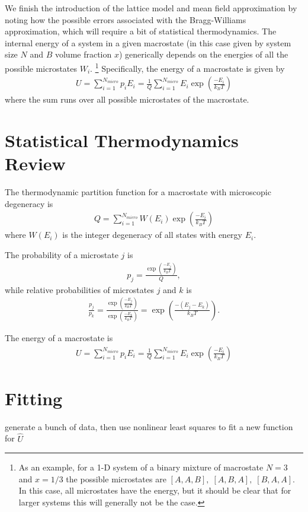 \documentclass[10pt]{article}
\begin{document}
We finish the introduction of the lattice model and mean field approximation by noting how the possible errors associated with the Bragg-Williams approximation, which will require a bit of statistical thermodynamics.
The internal energy of a system in a given macrostate (in this case given by system size $N$ and $B$ volume fraction $x$) generically depends on the energies of all the possible microstates $W_i$. \footnote{As an example, for a 1-D system of a binary mixture of macrostate $N=3$ and $x=1/3$ the possible microstates are $[A,A,B],\; [A,B,A],\; [B,A,A]$. In this case, all microstates have the energy, but it should be clear that for larger systems this will generally not be the case.}
Specifically, the energy of a macrostate is given by
\begin{align}
    U = \sum_{i=1}^{N_{micro}} p_i E_i
    = \frac{1}{Q} \sum_{i=1}^{N_{micro}} E_i \exp\left(\frac{-E_i}{k_B T}\right)
\end{align}
where the sum runs over all possible microstates of the macrostate.


\section{Statistical Thermodynamics Review}
The thermodynamic partition function for a macrostate with microscopic degeneracy is
\begin{align}
    Q = \sum_{i=1}^{N_{micro}} W(E_i) \exp \left(\frac{-E_i}{k_B T} \right)
\end{align}
where $W(E_i)$ is the integer degeneracy of all states with energy $E_i$.

The probability of a microstate $j$ is
\begin{align}
    p_j = \frac{\exp\left(\frac{-E_j}{k_B T}\right)}{Q} ,
\end{align}
while relative probabilities of microstates $j$ and $k$ is
\begin{align}
    \frac{p_j}{p_k} =
    \frac{\exp\left(\frac{-E_j}{k_B T}\right)}{\exp\left(\frac{-E_k}{k_B T}\right)}
    = \exp\left(\frac{-(E_j-E_k)}{k_B T}\right).
\end{align}

The energy of a macrostate is
\begin{align}
    U = \sum_{i=1}^{N_{micro}} p_i E_i
    = \frac{1}{Q} \sum_{i=1}^{N_{micro}} E_i \exp\left(\frac{-E_i}{k_B T}\right)
\end{align}

\section{Fitting}
generate a bunch of data, then use nonlinear least squares to fit a new function for $\hat{U}$
\end{document}
